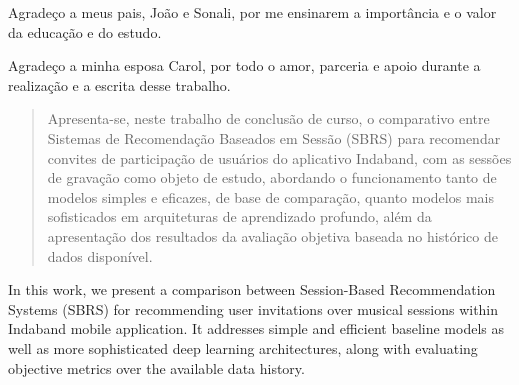 \documentclass[tcc,numbers]{coppe}
\begin{document}
  Agradeço a meus pais, João e Sonali, por me ensinarem a importância e o valor
  da educação e do estudo.

  Agradeço a minha esposa Carol, por todo o amor, parceria e apoio durante a realização
  e a escrita desse trabalho.

  \begin{abstract}

  Apresenta-se, neste trabalho de conclusão de curso, o comparativo entre
 Sistemas de Recomendação Baseados em Sessão (SBRS)  para recomendar convites de
 participação de usuários do aplicativo Indaband, com as sessões de gravação
 como objeto de estudo, abordando o funcionamento tanto de modelos simples e
 eficazes, de base de comparação, quanto modelos mais sofisticados em
 arquiteturas de aprendizado profundo, além da apresentação dos resultados da
 avaliação objetiva baseada no histórico de dados disponível.
  \end{abstract}

  \begin{foreignabstract}

  
  In this work, we present a comparison between Session-Based Recommendation
  Systems (SBRS) for recommending user invitations over musical sessions within
  Indaband mobile application. It addresses simple and efficient baseline models
  as well as more sophisticated deep learning architectures, along with
  evaluating objective metrics over the available data history.

  \end{foreignabstract}

  \tableofcontents
  \listoffigures
  \listoftables
  \printlosymbols
  \printloabbreviations
  \mainmatter
  

  

  

  

  



  \backmatter
  
  
  

  \appendix
  
\end{document}
